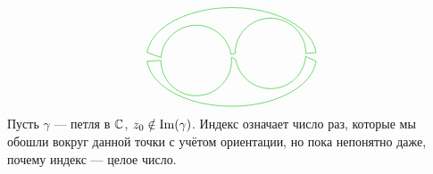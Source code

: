 \documentclass[a4paper]{report}
\begin{document}
{\[\begin{tikzpicture}
        \draw[darkgreen,domain=5:175] plot ({2 + 2.4 * cos(\x)}, {1.6 + 1.4 * sin(\x)});
        \draw[darkgreen,domain=185:355] plot ({2 + 2.4 * cos(\x)}, {1.6 + 1.4 * sin(\x)});
        \draw[darkgreen,domain=10:175] plot ({1 + cos(\x)}, {1.5 + sin(\x)});
        \draw[darkgreen,domain=180:365] plot ({1 + cos(\x)}, {1.5 + sin(\x)});
        \draw[darkgreen,domain=0:180] plot ({3.1 + cos(\x)}, {1.7 + sin(\x)});
        \draw[darkgreen,domain=190:355] plot ({3.1 + cos(\x)}, {1.7 + sin(\x)});
          \draw[darkgreen] ({1 + cos(10)}, {1.5 + sin(10)}) -- ({3.1 + cos(180)}, {1.7 + sin(180)});
          \draw[darkgreen] ({1 + cos(365)}, {1.5 + sin(365)}) -- ({3.1 + cos(190)}, {1.7 + sin(190)});
          \draw[darkgreen] ({1 + cos(175)}, {1.5 + sin(175)}) -- ({2 + 2.4 * cos(175)}, {1.6 + 1.4 * sin(175)});
          \draw[darkgreen] ({1 + cos(180)}, {1.5 + sin(180)}) -- ({2 + 2.4 * cos(185)}, {1.6 + 1.4 * sin(185)});
          \draw[darkgreen] ({3.1 + cos(0)}, {1.7 + sin(0)}) -- ({2 + 2.4 * cos(5)}, {1.6 + 1.4 * sin(175)});
          \draw[darkgreen] ({3.1 + cos(355)}, {1.7 + sin(355)}) -- ({2 + 2.4 * cos(355)}, {1.6 + 1.4 * sin(355)});
    \end{tikzpicture}\]
    }
    Пусть $\gamma$ --- петля в $\mathbb{C}$, $z_0 \notin \operatorname{Im}(\gamma)$.
    Индекс означает число раз, которые мы обошли вокруг данной точки с учётом ориентации, но пока непонятно даже, почему индекс --- целое число.
\end{document}
